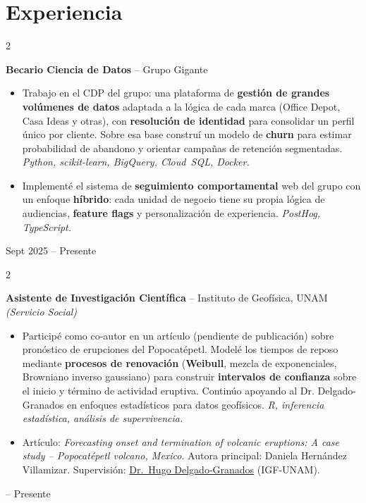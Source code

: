 \documentclass[10pt, letterpaper]{article}
\newenvironment{highlights}{
    \begin{itemize}[
        topsep=0.10 cm,
        parsep=0.10 cm,
        partopsep=0pt,
        itemsep=0pt,
        leftmargin=0.4 cm + 10pt
    ]
}{
    \end{itemize}
} %
\newenvironment{twocolentry}[2][]{
    \onecolentry
    \def\secondColumn{#2}
    \setcolumnwidth{\fill, 4.5 cm}
    \begin{paracol}{2}
}{
    \switchcolumn \raggedleft \secondColumn
    \end{paracol}
    \endonecolentry
} %
\let\hrefWithoutArrow\href
\renewcommand{\href}[2]{\hrefWithoutArrow{#1}{\ifthenelse{\equal{#2}{}}{ }{#2 }\raisebox{.15ex}{\footnotesize \faExternalLink*}}}
\begin{document}
    \section{Experiencia}

        \begin{twocolentry}{
            Sept 2025 -- Presente
        }
            \textbf{Becario Ciencia de Datos} -- Grupo Gigante
            \begin{highlights}
                \item Trabajo en el CDP del grupo: una plataforma de \textbf{gestión de grandes volúmenes de datos} adaptada a la lógica de cada marca (Office Depot, Casa Ideas y otras), con \textbf{resolución de identidad} para consolidar un perfil único por cliente. Sobre esa base construí un modelo de \textbf{churn} para estimar probabilidad de abandono y orientar campañas de retención segmentadas. \textit{Python, scikit-learn, BigQuery, Cloud~SQL, Docker.}
                \item Implementé el sistema de \textbf{seguimiento comportamental} web del grupo con un enfoque \textbf{híbrido}: cada unidad de negocio tiene su propia lógica de audiencias, \textbf{feature flags} y personalización de experiencia. \textit{PostHog, TypeScript.}
            \end{highlights}
        \end{twocolentry}

        \vspace{0.2 cm}

        \begin{twocolentry}{
            2025 -- Presente
        }
            \textbf{Asistente de Investigación Científica} -- Instituto de Geofísica, UNAM \textit{(Servicio Social)}
            \begin{highlights}
                \item Participé como co-autor en un artículo (pendiente de publicación) sobre pronóstico de erupciones del Popocatépetl. Modelé los tiempos de reposo mediante \textbf{procesos de renovación} (\textbf{Weibull}, mezcla de exponenciales, Browniano inverso gaussiano) para construir \textbf{intervalos de confianza} sobre el inicio y término de actividad eruptiva. Continúo apoyando al Dr. Delgado-Granados en enfoques estadísticos para datos geofísicos. \textit{R, inferencia estadística, análisis de supervivencia.}
                \item Artículo: \textit{Forecasting onset and termination of volcanic eruptions: A case study -- Popocatépetl volcano, Mexico}. Autora principal: Daniela Hernández Villamizar. Supervisión: \hrefWithoutArrow{https://scholar.google.com/citations?user=lDD0DZQAAAAJ}{Dr.\ Hugo Delgado-Granados} (IGF-UNAM).
            \end{highlights}
        \end{twocolentry}
\end{document}
